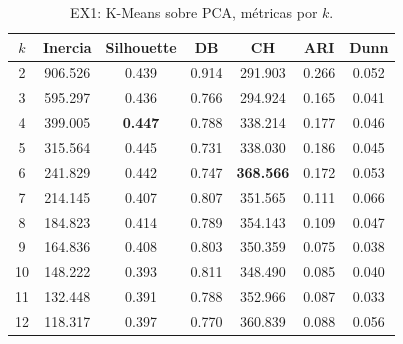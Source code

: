 \documentclass[11pt,a4paper]{article}
\begin{document}
\begin{table}[H]
  \centering
  \caption{EX1: K-Means sobre PCA, métricas por $k$.}
  \label{tab:kmeans_pca}
  \footnotesize
  \begin{tabular}{@{}ccccccc@{}}
    \toprule
    $k$ & \textbf{Inercia} & \textbf{Silhouette} & \textbf{DB} & \textbf{CH} & \textbf{ARI} & \textbf{Dunn} \\
    \midrule
    2 & 906.526 & 0.439 & 0.914 & 291.903 & 0.266 & 0.052 \\
    3 & 595.297 & 0.436 & 0.766 & 294.924 & 0.165 & 0.041 \\
    4 & 399.005 & \textbf{0.447} & 0.788 & 338.214 & 0.177 & 0.046 \\
    5 & 315.564 & 0.445 & 0.731 & 338.030 & 0.186 & 0.045 \\
    6 & 241.829 & 0.442 & 0.747 & \textbf{368.566} & 0.172 & 0.053 \\
    7 & 214.145 & 0.407 & 0.807 & 351.565 & 0.111 & 0.066 \\
    8 & 184.823 & 0.414 & 0.789 & 354.143 & 0.109 & 0.047 \\
    9 & 164.836 & 0.408 & 0.803 & 350.359 & 0.075 & 0.038 \\
    10 & 148.222 & 0.393 & 0.811 & 348.490 & 0.085 & 0.040 \\
    11 & 132.448 & 0.391 & 0.788 & 352.966 & 0.087 & 0.033 \\
    12 & 118.317 & 0.397 & 0.770 & 360.839 & 0.088 & 0.056 \\
    \bottomrule
  \end{tabular}
\end{table}
\end{document}
